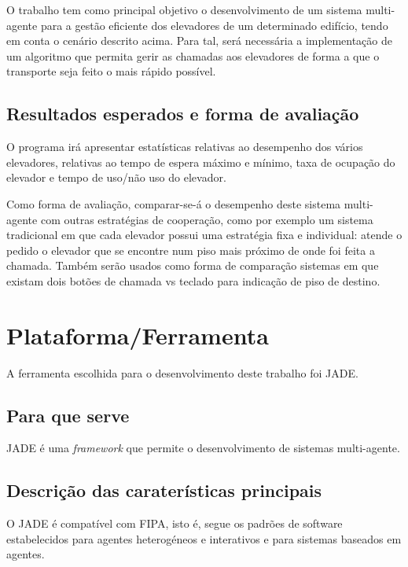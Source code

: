\documentclass[a4paper]{article}
\begin{document}
O trabalho tem como principal objetivo o desenvolvimento de um sistema multi-agente para a gestão eficiente dos elevadores de um determinado edifício, tendo em conta o cenário descrito acima. Para tal, será necessária a implementação de um algoritmo que permita gerir as chamadas aos elevadores de forma a que o transporte seja feito o mais rápido possível.

\subsection{Resultados esperados e forma de avaliação} 

O programa irá apresentar estatísticas relativas ao desempenho dos vários elevadores, relativas ao tempo de espera máximo e mínimo, taxa de ocupação do elevador e tempo de uso/não uso do elevador.

Como forma de avaliação, comparar-se-á o desempenho deste sistema multi-agente com outras estratégias de cooperação, como por exemplo um sistema tradicional em que cada elevador possui uma estratégia fixa e individual: atende o pedido o elevador que se encontre num piso mais próximo de onde foi feita a chamada. Também serão usados como forma de comparação sistemas em que existam dois botões de chamada vs teclado para indicação de piso de destino.

\newpage

\section{Plataforma/Ferramenta}

A ferramenta escolhida para o desenvolvimento deste trabalho foi JADE.

\subsection{Para que serve} 

JADE é uma \textit{framework} que permite o desenvolvimento de sistemas multi-agente.

\subsection{Descrição das caraterísticas principais} 

O JADE é compatível com FIPA, isto é, segue os padrões de software estabelecidos para agentes heterogéneos e interativos e para sistemas baseados em agentes.
\end{document}
